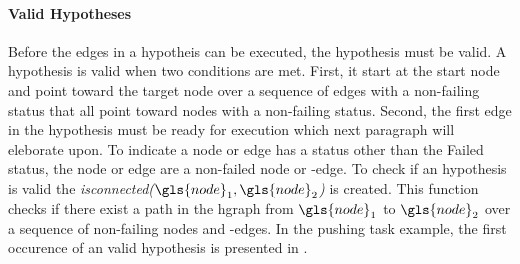 \paragraph{Valid Hypotheses}
Before the edges in a hypotheis can be executed, the hypothesis must be valid. A hypothesis is valid when two conditions are met. First, it start at the start node and point toward the target node over a sequence of edges with a non-failing status that all point toward nodes with a non-failing status. Second, the first edge in the hypothesis must be ready for execution which next paragraph will eleborate upon. To indicate a node or edge has a status other than the Failed status, the node or edge are a non-failed node or -edge. To check if an hypothesis is valid the \textit{isconnected($\gls{node}_1, \gls{node}_2$)} is created. This function checks if there exist a path in the \ac{hgraph} from $\gls{node}_1$ to $\gls{node}_2$ over a sequence of non-failing nodes and -edges. In the pushing task example, the first occurence of an valid hypothesis is presented in .\bs

